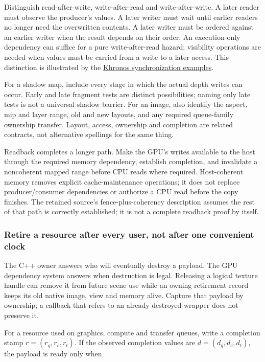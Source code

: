 Distinguish read-after-write, write-after-read and write-after-write. A later reader must observe the producer's values. A later writer must wait until earlier readers no longer need the overwritten contents. A later writer must be ordered against an earlier writer when the result depends on their order. An execution-only dependency can suffice for a pure write-after-read hazard; visibility operations are needed when values must be carried from a write to a later access. This distinction is illustrated by the \href{https://docs.vulkan.org/guide/latest/synchronization_examples.html}{Khronos synchronization examples}.

For a shadow map, include every stage in which the actual depth writes can occur. Early and late fragment tests are distinct possibilities; naming only late tests is not a universal shadow barrier. For an image, also identify the aspect, mip and layer range, old and new layouts, and any required queue-family ownership transfer. Layout, access, ownership and completion are related contracts, not alternative spellings for the same thing.

Readback completes a longer path. Make the GPU's writes available to the host through the required memory dependency, establish completion, and invalidate a noncoherent mapped range before CPU reads where required. Host-coherent memory removes explicit cache-maintenance operations; it does not replace producer/consumer dependencies or authorize a CPU read before the copy finishes. The retained source's fence-plus-coherency description assumes the rest of that path is correctly established; it is not a complete readback proof by itself.

\subsubsection{Retire a resource after every user, not after one convenient clock}\label{05-engine-i-ch019-retire-a-resource-after-every-user-not-after-one-convenient-clock}

The C++ owner answers who will eventually destroy a payload. The GPU dependency system answers when destruction is legal. Releasing a logical texture handle can remove it from future scene use while an owning retirement record keeps its old native image, view and memory alive. Capture that payload by ownership; a callback that refers to an already destroyed wrapper does not preserve it.

For a resource used on graphics, compute and transfer queues, write a completion stamp \(r=(r_g,r_c,r_t)\). If the observed completion values are \(d=(d_g,d_c,d_t)\), the payload is ready only when

